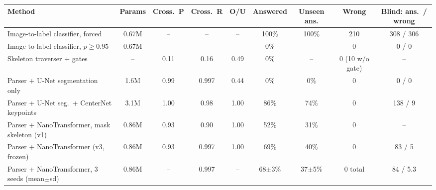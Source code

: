 \begin{tabular}{@{}lcccccccc@{}}
\toprule
Method & Params & Cross.\ P & Cross.\ R & O/U & Answered & Unseen ans. & Wrong & Blind: ans.\ / wrong \\
\midrule
Image-to-label classifier, forced & 0.67M & -- & -- & -- & 100\% & 100\% & 210 & 308 / 306 \\
Image-to-label classifier, $p\ge0.95$ & 0.67M & -- & -- & -- & 0\% & -- & 0 & 0 / 0 \\
Skeleton traverser + gates & -- & 0.11 & 0.16 & 0.49 & 0\% & -- & 0 (10 w/o gate) & -- \\
\midrule
Parser + U-Net segmentation only & 1.6M & 0.99 & 0.997 & 0.44 & 0\% & 0\% & 0 & 0 / 0 \\
Parser + U-Net seg.\ + CenterNet keypoints & 3.1M & 1.00 & 0.98 & 1.00 & 86\% & 74\% & 0 & 138 / 9 \\
Parser + NanoTransformer, mask skeleton (v1) & 0.86M & 0.93 & 0.90 & 1.00 & 52\% & 31\% & 0 & -- \\
Parser + NanoTransformer (v3, frozen) & 0.86M & 0.93 & 0.997 & 1.00 & 69\% & 40\% & 0 & 83 / 5 \\
Parser + NanoTransformer, 3 seeds (mean$\pm$sd) & 0.86M & -- & 0.997 & -- & 68$\pm$3\% & 37$\pm$5\% & 0 total & 84 / 5.3 \\
\bottomrule
\end{tabular}
